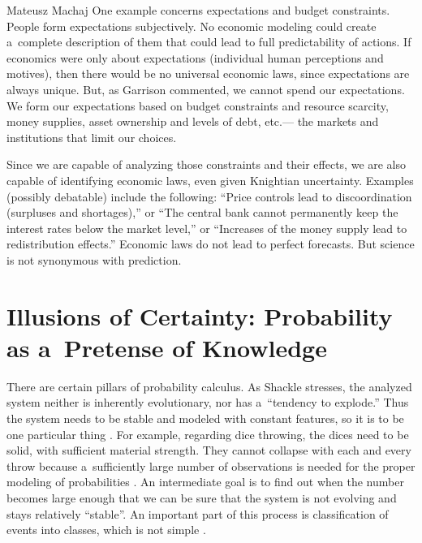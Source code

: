 \begin{artengenv}{Mateusz Machaj}
One example concerns expectations and budget constraints. People form expectations subjectively. No economic modeling could create a~complete description of them that could lead to full predictability of actions. If economics were only about expectations (individual human perceptions and motives), then there would be no universal economic laws, since expectations are always unique. But, as Garrison 
\parencite[][p.9]{garrison_time_2001} %
 commented, we cannot spend our expectations. We form our expectations based on budget constraints and resource scarcity, money supplies, asset ownership and levels of debt, etc.--- the markets and institutions that limit our choices.



Since we are capable of analyzing those constraints and their effects, we are also capable of identifying economic laws, even given Knightian uncertainty. Examples (possibly debatable) include the following: ``Price controls lead to discoordination (surpluses and shortages),'' or ``The central bank cannot permanently keep the interest rates below the market level,'' or ``Increases of the money supply lead to redistribution effects.'' Economic laws do not lead to perfect forecasts. But science is not synonymous with prediction.



\section{Illusions of Certainty: Probability as a~Pretense of Knowledge}

There are certain pillars of probability calculus. As Shackle stresses, the analyzed system neither is inherently evolutionary, nor has a~``tendency to explode.'' Thus the system needs to be stable and modeled with constant features, so it is to be one particular thing 
\parencite[][p.381]{shackle_epistemics_1972}. %
 For example, regarding dice throwing, the dices need to be solid, with sufficient material strength. They cannot collapse with each and every throw because a~sufficiently large number of observations is needed for the proper modeling of probabilities 
\parencite[][p.91]{salmon_foundations_1967}. %
 An intermediate goal is to find out when the number becomes large enough that we can be sure that the system is not evolving and stays relatively ``stable''. An important part of this process is classification of events into classes, which is not simple 
\parencite[][pp.337–338]{swinburne_probability_1971}.%





\end{artengenv}
